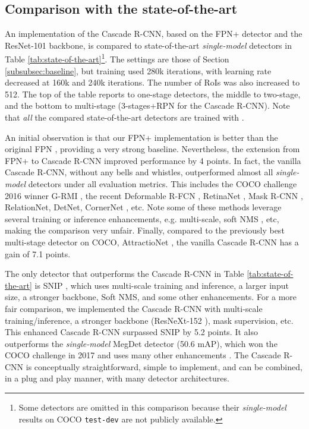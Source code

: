 \documentclass[10pt,journal,compsoc]{IEEEtran}
\begin{document}
\subsection{Comparison with the state-of-the-art}
\label{subsec:state-of-the-art}

An implementation of the Cascade R-CNN, based on the FPN+ detector and the ResNet-101 backbone, is compared to state-of-the-art \emph{single-model}
detectors in Table \ref{tab:state-of-the-art}\footnote{Some
detectors are omitted in this comparison because their \emph{single-model}
results on COCO \texttt{test-dev} are not publicly available.}. The
settings are those of Section \ref{subsubsec:baseline}, but training
used 280k iterations, with learning rate decreased at 160k and 240k
iterations. The number of RoIs was also increased to 512. The top
of the table reports to one-stage detectors, the middle to two-stage, and the
bottom to multi-stage (3-stages+RPN for the Cascade R-CNN). Note that
{\it all} the compared state-of-the-art detectors are trained
with .

An initial observation is that our FPN+ implementation is
better than the original FPN \cite{lin2017feature}, providing a very strong
baseline. Nevertheless, the extension from FPN+ to Cascade R-CNN improved
performance by 4 points. In fact, the vanilla Cascade R-CNN, without
any bells and whistles, outperformed almost all \emph{single-model} detectors
under all evaluation metrics. This includes the COCO challenge 2016 winner
G-RMI \cite{DBLP:journals/corr/HuangRSZKFFWSG016}, the recent
Deformable R-FCN \cite{dai2017deformable}, RetinaNet \cite{lin2017focal},
Mask R-CNN \cite{he2017mask}, RelationNet\cite{hu2018relation},
DetNet\cite{DBLP:conf/eccv/LiPYZDS18}, CornerNet \cite{DBLP:conf/eccv/LawD18},
etc. Note some of these methods leverage several training or inference enhancements,
e.g. multi-scale, soft NMS \cite{DBLP:conf/iccv/BodlaSCD17}, etc,
making the comparison very unfair. Finally, compared to the previously best
multi-stage detector on COCO, AttractioNet \cite{DBLP:conf/bmvc/GidarisK16}, the vanilla Cascade R-CNN has a gain of 7.1
points.

The only detector that outperforms the Cascade R-CNN in
Table \ref{tab:state-of-the-art} is SNIP \cite{singh2018analysis},
which uses multi-scale training and inference, a larger input size,
a stronger backbone, Soft NMS, and some other enhancements. For a more fair
comparison, we implemented the Cascade R-CNN with multi-scale
training/inference, a stronger backbone (ResNeXt-152 \cite{DBLP:conf/cvpr/XieGDTH17}), mask supervision, etc.
This enhanced Cascade R-CNN surpassed SNIP by 5.2 points. It
also outperforms the \emph{single-model} MegDet detector (50.6 mAP),
which won the COCO challenge in 2017 and uses many other
enhancements \cite{peng2018megdet}. The Cascade R-CNN is conceptually
straightforward, simple to implement, and can be combined, in a plug and play
manner, with many detector architectures.
\end{document}
